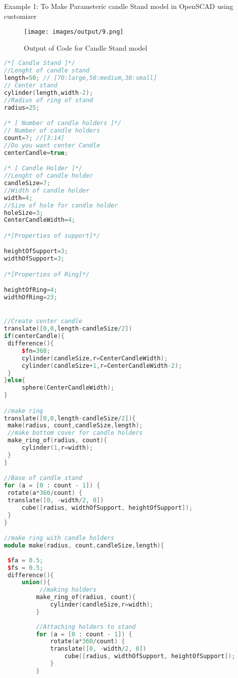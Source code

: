 Example 1: 
To Make Parameteric candle Stand model in OpenSCAD using customizer

\begin{figure}[H] 
	\centering \texttt{[image: images/output/9.png]}
	\caption{Output of Code for Candle Stand model}
\end{figure}

\begin{lstlisting}[language=c++]
/*[ Candle Stand ]*/
//Lenght of candle stand
length=50; // [70:large,50:medium,30:small]
// Center stand
cylinder(length,width-2);
//Radius of ring of stand
radius=25;

/* [ Number of candle holders ]*/
// Number of candle holders
count=7; //[3:14]
//Do you want center Candle
centerCandle=true;

/* [ Candle Holder ]*/
//Lenght of candle holder
candleSize=7;
//Width of candle holder
width=4;
//Size of hole for candle holder
holeSize=3;
CenterCandleWidth=4;

/*[Properties of support]*/

heightOfSupport=3;
widthOfSupport=3;

/*[Properties of Ring]*/

heightOfRing=4;
widthOfRing=23;


//Create center candle
translate([0,0,length-candleSize/2])
if(centerCandle){
 difference(){
     $fn=360;
     cylinder(candleSize,r=CenterCandleWidth);
     cylinder(candleSize+1,r=CenterCandleWidth-2);
 }
}else{
     sphere(CenterCandleWidth);
}

//make ring 
translate([0,0,length-candleSize/2]){
 make(radius, count,candleSize,length);
 //make bottom cover for candle holders
 make_ring_of(radius, count){
     cylinder(1,r=width);
 }
}

//Base of candle stand
for (a = [0 : count - 1]) {
 rotate(a*360/count) {
 translate([0, -width/2, 0]) 
     cube([radius, widthOfSupport, heightOfSupport]);
 }
}

//make ring with candle holders
module make(radius, count,candleSize,length){
 
 $fa = 0.5;
 $fs = 0.5;
 difference(){
     union(){
          //making holders
         make_ring_of(radius, count){ 
             cylinder(candleSize,r=width);
         }
         
         //Attaching holders to stand
         for (a = [0 : count - 1]) {
             rotate(a*360/count) {
             translate([0, -width/2, 0]) 
                 cube([radius, widthOfSupport, heightOfSupport]);
             }
         }
         

\end{lstlisting}
